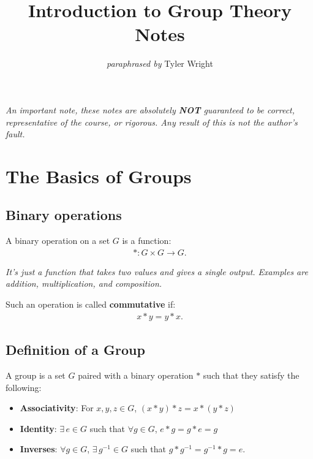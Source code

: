 \documentclass[a4paper, 12pt, twoside]{article}
\begin{document}
\title{Introduction to Group Theory Notes}
\date{}
\author{\textit{paraphrased by} Tyler Wright}
\maketitle

\vfill

\textit{An important note, these notes are absolutely \textbf{NOT}
      guaranteed to be correct, representative of the course, or rigorous.
      Any result of this is not the author's fault.}

\newpage

\section{The Basics of Groups}

\subsection{Binary operations}

A binary operation on a set $G$ is a function:
\begin{align*}
      * : G \times G \to G.
\end{align*}

\textit{It's just a function that takes two values and gives a single
      output. Examples are addition, multiplication, and composition.}

\vspace{\baselineskip}

Such an operation is called \textbf{commutative} if:
\begin{align*}
      x * y = y * x. \tag{$\forall x, y \in G$}
\end{align*}

\subsection{Definition of a Group}

A group is a set $G$ paired with a binary operation $*$ such that they satisfy
the following:

\begin{itemize}
      \item \textbf{Associativity}: For $x, y, z \in G$,
            $(x * y) * z = x * (y * z)$
      \item \textbf{Identity}: $\exists \, e \in G$ such that
            $\forall g \in G$, $e * g = g * e = g$
      \item \textbf{Inverses}: $\forall g \in G$, $\exists \, g^{-1} \in G$
            such that $g * g^{-1} = g^{-1} * g = e$.
\end{itemize}
\end{document}
